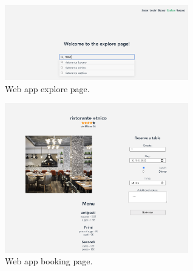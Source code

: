 \begin{figure}
    \begin{center}
        \includegraphics[width=8cm]{./images/explore_page.png}
    \end{center}
    \caption{Web app explore page.}
    \label{fig:explore_page}
\end{figure}

\begin{figure}
    \begin{center}
        \includegraphics[width=8cm]{./images/booking_page.png}
    \end{center}
    \caption{Web app booking page.}
    \label{fig:booking_page}
\end{figure}
